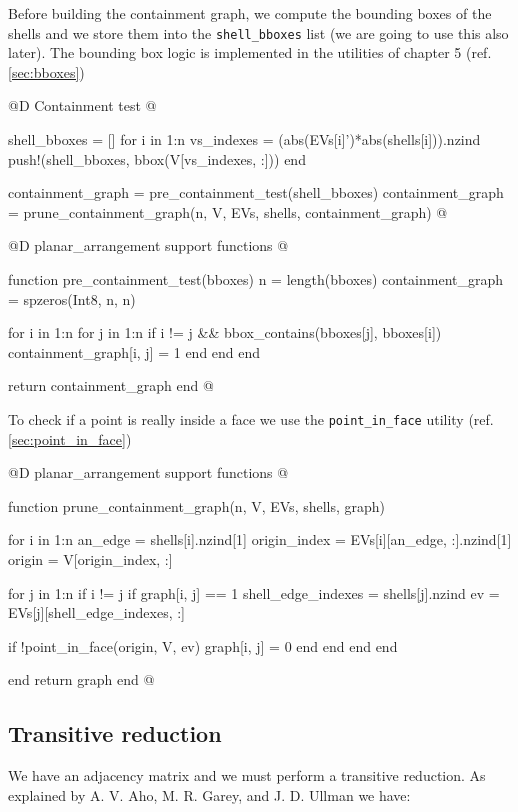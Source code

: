 Before building the containment graph, we
compute the bounding boxes of the shells and we store them into
the \texttt{shell\_bboxes} list (we are going to use this also later).
The bounding box logic is implemented in the utilities of chapter 5 
(ref. \ref{sec:bboxes})

@D Containment test
@{shell_bboxes = []
for i in 1:n
    vs_indexes = (abs(EVs[i]')*abs(shells[i])).nzind
    push!(shell_bboxes, bbox(V[vs_indexes, :]))
end

containment_graph = pre_containment_test(shell_bboxes)
containment_graph = prune_containment_graph(n, V, EVs, shells, containment_graph)
@}

@D planar\_arrangement support functions
@{function pre_containment_test(bboxes)
    n = length(bboxes)
    containment_graph = spzeros(Int8, n, n)

    for i in 1:n
        for j in 1:n
            if i != j && bbox_contains(bboxes[j], bboxes[i])
                containment_graph[i, j] = 1
            end
        end
    end

    return containment_graph
end
@}

To check if a point is really inside a face we use the
\texttt{point\_in\_face} utility (ref. \ref{sec:point_in_face})

@D planar\_arrangement support functions
@{function prune_containment_graph(n, V, EVs, shells, graph)
    
    for i in 1:n
        an_edge = shells[i].nzind[1]
        origin_index = EVs[i][an_edge, :].nzind[1]
        origin = V[origin_index, :]
 
        for j in 1:n
            if i != j
                if graph[i, j] == 1
                    shell_edge_indexes = shells[j].nzind
                    ev = EVs[j][shell_edge_indexes, :]

                    if !point_in_face(origin, V, ev)
                        graph[i, j] = 0
                    end
                end
             end
         end

     end
     return graph
end
@}

\subsection{Transitive reduction}

We have an adjacency matrix and we must perform a transitive reduction.
As explained by A. V. Aho, M. R. Garey, and J. D. Ullman \cite{parallel_transitive_reduction}
we have:

